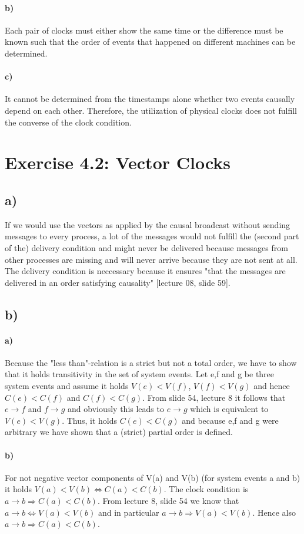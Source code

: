 \documentclass[12pt,a4paper]{article}
\begin{document}
  	\paragraph{b)} Each pair of clocks must either show the same time or the difference must be known such that the order of events that happened on different machines can be determined.
  	\paragraph{c)} It cannot be determined from the timestamps alone whether two events causally depend on each other. Therefore, the utilization of physical clocks does not fulfill the converse of the clock condition.
  	
\section{Exercise 4.2: Vector Clocks}
	\subsection*{a)} %
	If we would use the vectors as applied by the causal broadcast without sending messages to every process, a lot of the messages would not fulfill the (second part of the) delivery condition and might never be delivered because messages from other processes are missing and will never arrive because they are not sent at all. The delivery condition is neccessary because it ensures "that the messages are delivered in an order
	satisfying causality" [lecture 08, slide 59].
	\subsection*{b)} %
		\paragraph{a)} Because the "less than"-relation is a strict but not a total order, we have to show that it holds transitivity in the set of system events. Let e,f and g be three system events and assume it holds $V(e)<V(f)$, $V(f)<V(g)$ and hence $C(e)<C(f)$ and $C(f)<C(g)$. From slide 54, lecture 8 it follows that $e \rightarrow f$ and $f \rightarrow g$ and obviously this leads to $e \rightarrow g$ which is equivalent to $V(e)<V(g)$. Thus, it holds $C(e)<C(g)$ and because e,f and g were arbitrary we have shown that a (strict) partial order is defined.
		\paragraph{b)} For not negative vector components of V(a) and V(b) (for system events a and b) it holds $V(a)<V(b) \Leftrightarrow C(a)<C(b)$. The clock condition is $a \rightarrow b \Rightarrow C(a)<C(b)$. From lecture 8, slide 54 we know that $a \rightarrow b \Leftrightarrow V(a)<V(b)$ and in particular  $a \rightarrow b \Rightarrow V(a)<V(b)$. Hence also $a \rightarrow b \Rightarrow C(a)<C(b)$.
\end{document}
